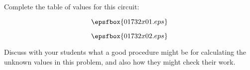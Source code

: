 

Complete the table of values for this circuit:

$$\epsfbox{01732x01.eps}$$







$$\epsfbox{01732x02.eps}$$







Discuss with your students what a good procedure might be for calculating the unknown values in this problem, and also how they might check their work.




